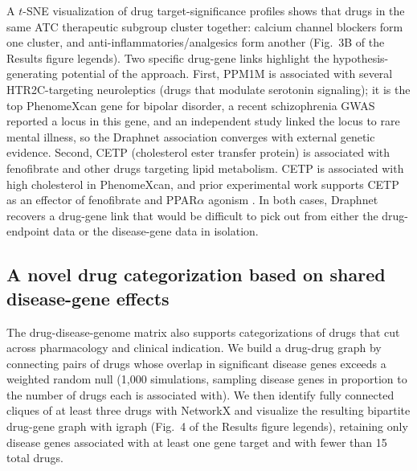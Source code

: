\documentclass[11pt]{article}
\begin{document}
A $t$-SNE visualization of
drug target-significance profiles shows that drugs in the same ATC
therapeutic subgroup cluster together: calcium channel blockers form
one cluster, and anti-inflammatories/analgesics form another (Fig.~3B
of the Results figure legends). Two specific drug-gene links highlight
the hypothesis-generating potential of the approach. First, PPM1M is
associated with several HTR2C-targeting neuroleptics (drugs that
modulate serotonin signaling); it is the top PhenomeXcan gene for
bipolar disorder, a recent schizophrenia GWAS reported a locus in this
gene, and an independent study linked the locus to rare mental illness,
so the Draphnet association converges with external genetic evidence.
Second, CETP (cholesterol ester transfer protein) is associated with
fenofibrate and other drugs targeting lipid metabolism. CETP is
associated with high cholesterol in PhenomeXcan, and prior experimental
work supports CETP as an effector of fenofibrate and
PPAR$\alpha$ agonism \citep{huang2022perm1}. In both cases, Draphnet
recovers a drug-gene link that would be difficult to pick out from
either the drug-endpoint data or the disease-gene data in isolation.

\subsection{A novel drug categorization based on shared disease-gene
effects}

The drug-disease-genome matrix also supports categorizations of drugs
that cut across pharmacology and clinical indication. We build a
drug-drug graph by connecting pairs of drugs whose overlap in
significant disease genes exceeds a weighted random null (1,000
simulations, sampling disease genes in proportion to the number of
drugs each is associated with). We then identify fully connected
cliques of at least three drugs with NetworkX and visualize the
resulting bipartite drug-gene graph with igraph (Fig.~4 of the
Results figure legends), retaining only disease genes associated with
at least one gene target and with fewer than 15 total drugs.
\end{document}
